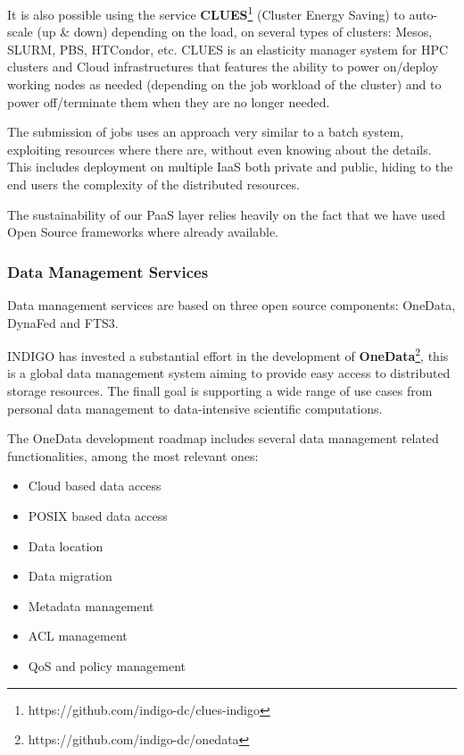 \documentclass{article}
\begin{document}
It is also possible using the service {\bf CLUES}\footnote{https://github.com/indigo-dc/clues-indigo} (Cluster Energy Saving) to auto-scale (up \& down) depending on the load, on several types of clusters: Mesos, SLURM, PBS, HTCondor, etc. CLUES is an elasticity manager system for HPC clusters and Cloud infrastructures that features the ability to power on/deploy working nodes as needed (depending on the job workload of the cluster) and to power off/terminate them when they are no longer needed.

The submission of jobs uses an approach very similar to a batch system, exploiting resources where there are, without even knowing about the details. This includes deployment on multiple IaaS both private and public, hiding to the end users the complexity of the distributed resources.

The sustainability of our PaaS layer relies heavily on the fact that we have used Open Source frameworks where already available. 


\subsubsection{Data Management Services}

Data management services are based on three open source components: OneData\cite{ONEDATA}, DynaFed\cite{DYNAFED} and FTS3\cite{FTS}.

INDIGO has invested a substantial effort in the development of {\bf OneData}\footnote{https://github.com/indigo-dc/onedata}, this is a global data management system aiming to provide easy access to distributed storage resources. The finall goal is supporting a  wide  range  of  use  cases  from  personal  data  management  to  data-intensive  scientific  computations. 

The OneData development roadmap includes several data management related functionalities, among the most relevant ones:

\begin{itemize}
\item Cloud based data access
\item POSIX based data access
\item Data location
\item Data migration
\item Metadata management
\item ACL management
\item QoS and policy management
\end{itemize}
\end{document}
